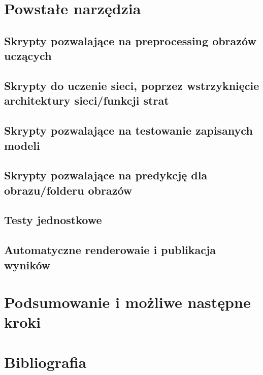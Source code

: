 \documentclass{article}
\begin{document}
\section{Powstałe narzędzia}
\subsection{Skrypty pozwalające na preprocessing obrazów uczących}
\subsection{Skrypty do uczenie sieci, poprzez wstrzyknięcie architektury sieci/funkcji strat}
\subsection{Skrypty pozwalające na testowanie zapisanych modeli}
\subsection{Skrypty pozwalające na predykcję dla obrazu/folderu obrazów}
\subsection{Testy jednostkowe}
\subsection{Automatyczne renderowaie i publikacja wyników}
\section{Podsumowanie i możliwe następne kroki}
\section{Bibliografia}
\end{document}
